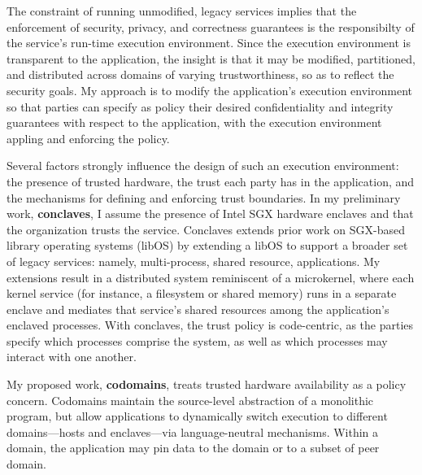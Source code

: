 

%
The constraint of running unmodified, legacy services implies that the
enforcement of security, privacy, and correctness guarantees is the
responsibilty of the service's run-time execution environment. 
%
Since the execution environment is transparent to the application, the insight
is that it may be modified, partitioned, and distributed across domains of
varying trustworthiness, so as to reflect the security goals.
%
My approach is to modify the application's execution environment so that
parties can specify as policy their desired confidentiality and integrity
guarantees with respect to the application, with the execution environment
appling and enforcing the policy.


Several factors strongly influence the design of such an execution environment:
the presence of trusted hardware, the trust each party has in the application,
and the mechanisms for defining and enforcing trust boundaries.
%
In my preliminary work, \textbf{conclaves}, I assume the presence of Intel SGX hardware
enclaves and that the organization trusts the service.
%
Conclaves extends prior work on SGX-based library operating systems (libOS) by
extending a libOS to support a broader set of legacy services: namely,
multi-process, shared resource, applications.
%
My extensions result in a distributed system reminiscent of a microkernel,
where each kernel service (for instance, a filesystem or shared memory)
runs in a separate enclave and mediates that service’s shared resources
among the application's enclaved processes.
%
With conclaves, the trust policy is code-centric, as the parties specify which
processes comprise the system, as well as which processes may interact with one
another.


My proposed work, \textbf{codomains}, treats trusted hardware availability as a
policy concern.
%
Codomains maintain the source-level abstraction of a monolithic program, but
allow applications to dynamically switch execution to different domains—hosts
and enclaves—via language-neutral mechanisms.
%
Within a domain, the application may pin data to the domain or to a subset of
peer domain.
%



